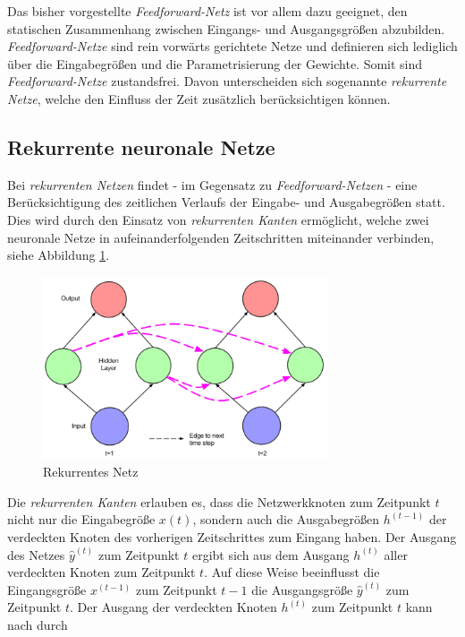 Das bisher vorgestellte \textit{Feedforward-Netz} ist vor allem dazu geeignet, den statischen Zusammenhang zwischen Eingangs- und Ausgangsgrößen abzubilden. \textit{Feedforward-Netze} sind rein vorwärts gerichtete Netze und definieren sich lediglich über die Eingabegrößen und die Parametrisierung der Gewichte. Somit sind \textit{Feedforward-Netze} zustandsfrei. Davon unterscheiden sich sogenannte \textit{rekurrente Netze}, welche den Einfluss der Zeit zusätzlich berücksichtigen können. 





\subsection{Rekurrente neuronale Netze}

Bei \textit{rekurrenten Netzen} findet - im Gegensatz zu \textit{Feedforward-Netzen} - eine Berücksichtigung des zeitlichen Verlaufs der Eingabe- und Ausgabegrößen statt. Dies wird durch den Einsatz von \textit{rekurrenten Kanten} ermöglicht, welche zwei neuronale Netze in aufeinanderfolgenden Zeitschritten miteinander verbinden, siehe Abbildung \ref{fig:recurrent}.  

\begin{figure} [h]
	\centering
	\includegraphics[width=0.75\textwidth]{images/recurrent_net}
	\caption{Rekurrentes Netz \cite{Lipton.5292015}}
	\label{fig:recurrent}
\end{figure}

Die \textit{rekurrenten Kanten} erlauben es, dass die Netzwerkknoten zum Zeitpunkt $t$ nicht nur die Eingabegröße $x(t)$, sondern auch die Ausgabegrößen $h^{(t-1)}$ der verdeckten Knoten des vorherigen Zeitschrittes zum Eingang haben. Der Ausgang des Netzes $\hat{y}^{(t)}$ zum Zeitpunkt $t$ ergibt sich aus dem Ausgang $h^{(t)}$ aller verdeckten Knoten zum Zeitpunkt $t$. Auf diese Weise beeinflusst die Eingangsgröße $x^{(t-1)}$ zum Zeitpunkt $t-1$ die Ausgangsgröße $\hat{y}^{(t)}$ zum Zeitpunkt $t$. Der Ausgang der verdeckten Knoten $h^{(t)}$ zum Zeitpunkt $t$ kann nach \cite{Lipton.5292015} durch 

